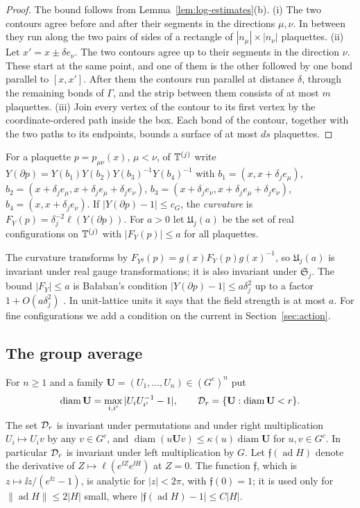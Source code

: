 \begin{proof}
The bound follows from Lemma~\ref{lem:log-estimates}(b). (i) The two contours agree before and after their segments in the directions $\mu,\nu$. In between they run along the two pairs of sides of a rectangle of $|n_\mu|\times|n_\nu|$ plaquettes. (ii) Let $x'=x\pm\delta e_\nu$. The two contours agree up to their segments in the direction $\nu$. These start at the same point, and one of them is the other followed by one bond parallel to $[x,x']$. After them the contours run parallel at distance $\delta$, through the remaining bonds of $\Gamma$, and the strip between them consists of at most $m$ plaquettes. (iii) Join every vertex of the contour to its first vertex by the coordinate-ordered path inside the box. Each bond of the contour, together with the two paths to its endpoints, bounds a surface of at most $ds$ plaquettes.
\end{proof}

\begin{definition}\label{def:curvature}
For a plaquette $p=p_{\mu\nu}(x)$, $\mu<\nu$, of $\mathbb T^{(j)}$ write $Y(\partial p)=Y(b_1)Y(b_2)Y(b_3)^{-1}Y(b_4)^{-1}$ with $b_1=(x,x+\delta_je_\mu)$, $b_2=(x+\delta_je_\mu,x+\delta_je_\mu+\delta_je_\nu)$, $b_3=(x+\delta_je_\nu,x+\delta_je_\mu+\delta_je_\nu)$, $b_4=(x,x+\delta_je_\nu)$. If $|Y(\partial p)-1|\le c_G$, the \emph{curvature} is $F_Y(p)=\delta_j^{-2}\ell(Y(\partial p))$. For $a>0$ let $\mathfrak U_j(a)$ be the set of real configurations on $\mathbb T^{(j)}$ with $|F_Y(p)|\le a$ for all plaquettes.
\end{definition}

The curvature transforms by $F_{Y^g}(p)=g(x)F_Y(p)g(x)^{-1}$, so $\mathfrak U_j(a)$ is invariant under real gauge transformations; it is also invariant under $\mathfrak S_j$. The bound $|F_Y|\le a$ is Ba\l aban's condition $|Y(\partial p)-1|\le a\delta_j^2$ up to a factor $1+O(a\delta_j^2)$ \cite[(1.7)]{BalReg}. In unit-lattice units it says that the field strength is at most $a$. For fine configurations we add a condition on the current in Section~\ref{sec:action}.

\subsection{The group average}\label{ss:21.3}

For $n\ge1$ and a family $\mathbf U=(U_1,\dots,U_n)\in(G^c)^n$ put
\[
\operatorname{diam}\mathbf U=\max_{i,i'}|U_iU_{i'}^{-1}-1|,\qquad\mathcal D_r=\{\mathbf U:\operatorname{diam}\mathbf U<r\}.
\]
The set $\mathcal D_r$ is invariant under permutations and under right multiplication $U_i\mapsto U_iv$ by any $v\in G^c$, and $\operatorname{diam}(u\mathbf Uv)\le\kappa(u)\operatorname{diam}\mathbf U$ for $u,v\in G^c$. In particular $\mathcal D_r$ is invariant under left multiplication by $G$. Let $\mathfrak f(\operatorname{ad}H)$ denote the derivative of $Z\mapsto\ell(e^{\ii Z}e^{\ii H})$ at $Z=0$. The function $\mathfrak f$, which is $z\mapsto\ii z/(e^{\ii z}-1)$, is analytic for $|z|<2\pi$, with $\mathfrak f(0)=1$; it is used only for $\|\operatorname{ad}H\|\le2|H|$ small, where $|\mathfrak f(\operatorname{ad}H)-1|\le C|H|$.

